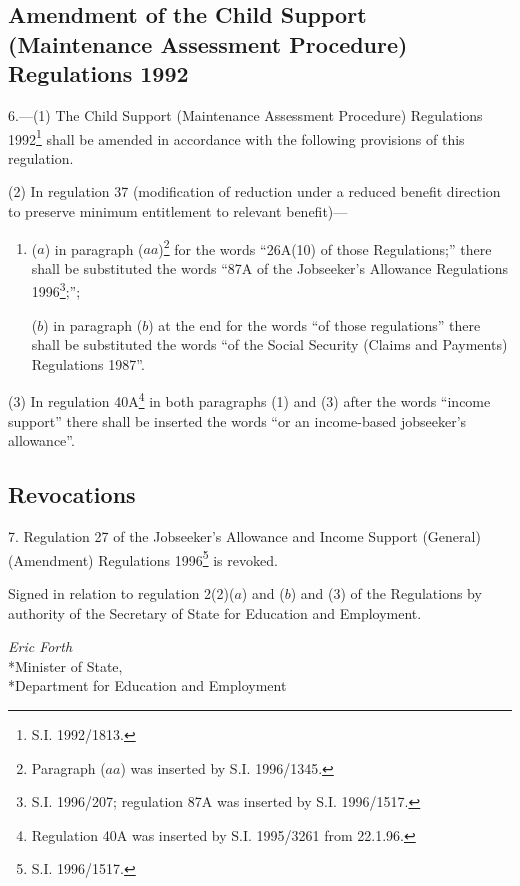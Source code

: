 \documentclass[a4paper]{article}
\begin{document}
\subsection[6. Amendment of the Child Support (Maintenance Assessment Procedure) Regulations 1992]{Amendment of the Child Support (Maintenance Assessment Procedure) Regulations 1992}

6.—(1) The Child Support (Maintenance Assessment Procedure) Regulations 1992\footnote{\frenchspacing S.I. 1992/1813.} shall be amended in accordance with the following provisions of this regulation.

(2) In regulation 37 (modification of reduction under a reduced benefit direction to preserve minimum entitlement to relevant benefit)—
\begin{enumerate}\item[]
($a$) in paragraph ($aa$)\footnote{\frenchspacing Paragraph ($aa$) was inserted by S.I. 1996/1345.} for the words “26A(10) of those Regulations;” there shall be substituted the words “87A of the Jobseeker’s Allowance Regulations 1996\footnote{\frenchspacing S.I. 1996/207; regulation 87A was inserted by S.I. 1996/1517.};”;

($b$) in paragraph ($b$) at the end for the words “of those regulations” there shall be substituted the words “of the Social Security (Claims and Payments) Regulations 1987”.
\end{enumerate}

(3) In regulation 40A\footnote{\frenchspacing Regulation 40A was inserted by S.I. 1995/3261 from 22.1.96.} in both paragraphs (1) and (3) after the words “income support” there shall be inserted the words “or an income-based jobseeker’s allowance”.

\subsection[7. Revocations]{Revocations}

7.  Regulation 27 of the Jobseeker’s Allowance and Income Support (General) (Amendment) Regulations 1996\footnote{\frenchspacing S.I. 1996/1517.} is revoked.

\bigskip

Signed in relation to regulation 2(2)($a$) and ($b$) and (3) of the Regulations by authority of the Secretary of State for Education and Employment.

{\raggedleft
\emph{Eric Forth}\\*Minister of State,\\*Department for Education and Employment

}
\end{document}
